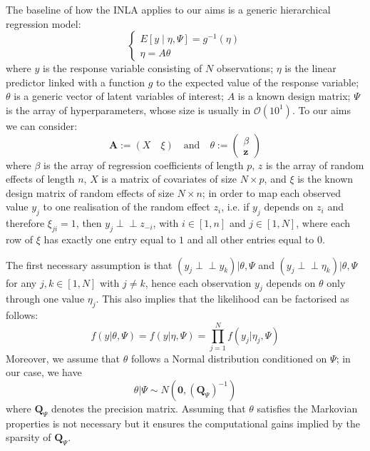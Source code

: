 \documentclass{book}
\begin{document}
The baseline of how the INLA applies to our aims is a generic hierarchical regression model:
$$\left\{ \begin{array}{ll} 
E[y\mid \eta, \Psi] = g^{-1}(\eta)\\
\eta = A \theta
\end{array} \right. 
$$
where $y$  is the response variable consisting of $N$ observations; $\eta$ is the linear predictor linked with a function $g$ to the expected value of the response variable; $\theta$ is a generic vector of latent variables of interest; $A$ is a known design matrix; $\Psi$ is the array of hyperparameters, whose size is usually in $\mathcal{O}(10^1)$. To our aims we can consider:
$$  \mathbf{A} := \left(X \quad \xi \right) \quad \text{and} \quad
\theta := \begin{pmatrix} \beta \\ \mathbf{z} \end{pmatrix}$$
where $\beta$ is the array of regression coefficients of length $p$, $z$ is the array of random effects of length $n$, $X$ is a matrix of covariates of size $N \times p$, and $\xi$ is the known design matrix of random effects of size $N \times n$; in order to map each observed value $y_j$ to one realisation of the random effect $z_i$, i.e. if $y_j$ depends on $z_i$ and therefore $\xi_{ji} = 1$, then  $y_j \perp\!\!\!\perp  z_{-i}$, with $i \in [1, n]$ and $j \in [1, N]$, where each row of $\xi$ has exactly one entry equal to $1$ and all other entries equal to $0$. 

The first necessary assumption is that $(y_j\perp\!\!\!\perp y_k )|\theta, \Psi$ and $(y_j\perp\!\!\!\perp \eta_k )|\theta, \Psi$ for any $j,k \in [1, N]$ with $j \neq k$, hence each observation $y_j$ depends on $\theta$ only through one value $\eta_j$. This also implies that the likelihood can be factorised as follows:
$$
f(y|\theta, \Psi) = f(y| \eta, \Psi) = \prod_{j = 1}^N f(y_j | \eta_j, \Psi)
$$
Moreover, we assume that $\theta$ follows a Normal distribution conditioned on $\Psi$; in our case, we have 
$$
\theta | \Psi \sim N(\mathbf{0}, (\mathbf{Q}_{\Psi})^{-1})
$$
where $\mathbf{Q}_{\Psi}$ denotes the precision matrix. Assuming that $\theta$ satisfies the Markovian properties is not necessary but it ensures the computational gains implied by the sparsity of $\mathbf{Q}_{\Psi}$.
\end{document}
